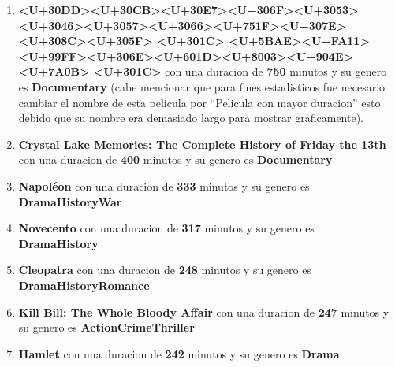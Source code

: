 \documentclass[
]{article}
\begin{document}
\begin{enumerate}
\def\labelenumi{\arabic{enumi}.}
\item
  \textbf{\textless U+30DD\textgreater\textless U+30CB\textgreater\textless U+30E7\textgreater\textless U+306F\textgreater\textless U+3053\textgreater\textless U+3046\textgreater\textless U+3057\textgreater\textless U+3066\textgreater\textless U+751F\textgreater\textless U+307E\textgreater\textless U+308C\textgreater\textless U+305F\textgreater{}
  \textless U+301C\textgreater{}
  \textless U+5BAE\textgreater\textless U+FA11\textgreater\textless U+99FF\textgreater\textless U+306E\textgreater\textless U+601D\textgreater\textless U+8003\textgreater\textless U+904E\textgreater\textless U+7A0B\textgreater{}
  \textless U+301C\textgreater{}} con una duracion de \textbf{750}
  minutos y su genero es \textbf{Documentary} (cabe mencionar que para
  fines estadisticos fue necesario cambiar el nombre de esta pelicula
  por ``Pelicula con mayor duracion'' esto debido que su nombre era
  demasiado largo para mostrar graficamente).
\item
  \textbf{Crystal Lake Memories: The Complete History of Friday the
  13th} con una duracion de \textbf{400} minutos y su genero es
  \textbf{Documentary}
\item
  \textbf{Napoléon} con una duracion de \textbf{333} minutos y su genero
  es \textbf{Drama\textbar History\textbar War}
\item
  \textbf{Novecento} con una duracion de \textbf{317} minutos y su
  genero es \textbf{Drama\textbar History}
\item
  \textbf{Cleopatra} con una duracion de \textbf{248} minutos y su
  genero es \textbf{Drama\textbar History\textbar Romance}
\item
  \textbf{Kill Bill: The Whole Bloody Affair} con una duracion de
  \textbf{247} minutos y su genero es
  \textbf{Action\textbar Crime\textbar Thriller}
\item
  \textbf{Hamlet} con una duracion de \textbf{242} minutos y su genero
  es \textbf{Drama}
\end{enumerate}
\end{document}

